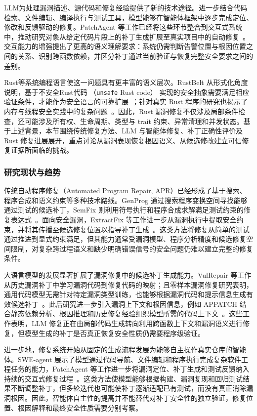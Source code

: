 LLM为处理漏洞描述、源代码和修复经验提供了新的技术途径。进一步结合代码检索、文件编辑、编译执行与测试工具，模型能够在智能体框架中逐步完成定位、修改和反馈驱动的修复。PatchAgent 等工作已经将这些环节整合到交互式系统中，推动研究对象从给定代码片段上的补丁生成扩展至真实项目中的自动修复~\cite{patchagent}。交互能力的增强提出了更高的语义理解要求：系统仍需判断告警位置与根因位置之间的关系、识别跨函数依赖，并区分补丁通过当前验证与恢复完整安全要求之间的差别。

Rust等系统编程语言使这一问题具有更丰富的语义层次。RustBelt 从形式化角度说明，基于不安全Rust代码 （\texttt{unsafe} Rust code） 实现的安全抽象需要满足相应验证条件，才能作为安全语言的可靠扩展~\cite{jung2018rustbelt}；针对真实 Rust 程序的研究也揭示了内存与线程安全实践中的复杂问题~\cite{qin2020rust}。因此，Rust 漏洞修复不仅涉及局部条件检查，还可能涉及所有权、生命周期、类型与 trait 约束、异常清理和并发状态。基于上述背景，本节围绕传统修复方法、LLM 与智能体修复、补丁正确性评价及 Rust 修复进展展开，重点讨论从漏洞表现恢复根因语义、从候选修改建立可信修复证据所面临的挑战。

\subsubsection{研究现状与趋势}

传统自动程序修复（Automated Program Repair, APR）已经形成了基于搜索、程序合成和语义约束等多种技术路线。GenProg 通过搜索程序变换空间寻找能够通过测试的候选补丁，SemFix 则利用符号执行和程序合成求解满足测试约束的修复表达式~\cite{genprog,nguyen2013semfix}。面向安全漏洞，ExtractFix 等工作进一步从漏洞执行中提取安全约束，并将其传播至候选修复位置以指导补丁生成~\cite{gao2021extractfix}。这类方法将修复从简单的测试通过推进到显式约束满足，但其能力通常受漏洞模型、程序分析精度和候选修复空间限制，对复杂跨过程语义和缺少明确错误信号的安全问题仍难以建立完整的修复条件。

大语言模型的发展显著扩展了漏洞修复中的候选补丁生成能力。VulRepair 等工作从历史漏洞补丁中学习漏洞代码到修复代码的映射；且零样本漏洞修复研究表明，通用代码模型无需针对特定漏洞类型训练，也能够根据漏洞代码和提示信息生成有效候选补丁~\cite{fu2022vulrepair,pearce2023zeroshot}。此后研究进一步引入漏洞上下文和根因信息，例如 APPATCH 结合静态依赖分析、根因推理和历史修复经验组织模型所需的代码上下文~\cite{nong2025appatch}。这些工作表明，LLM 修复正在由局部代码生成转向利用跨函数上下文和漏洞语义进行修复，但模型生成的补丁是否真正恢复安全性质仍需要程序级验证。

进一步地，修复系统开始从固定的生成流程发展为能够自主操作真实仓库的智能体。SWE-agent 展示了模型通过代码导航、文件编辑和程序执行完成复杂软件工程任务的能力，PatchAgent 等工作进一步将漏洞定位、补丁生成和测试反馈纳入持续的交互式修复过程~\cite{sweagent,patchagent}。这类方法使模型能够根据构建、漏洞复现和回归测试结果不断调整补丁，但多轮迭代也可能使补丁逐渐适配已有测试，而没有真正消除漏洞根因。因此，智能体自主性的提高并不能替代对补丁安全性的独立验证，修复位置、根因解释和最终安全性质需要分别考察。

